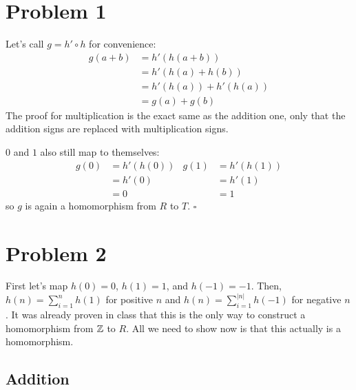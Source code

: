 \documentclass[12pt]{article}
\begin{document}
\section{Problem 1}

Let's call $g = h' \circ h$ for convenience:
\begin{align*}
  g(a+b)
   & = h'(h(a+b))        \\
   & = h'(h(a)+h(b))     \\
   & = h'(h(a))+h'(h(a)) \\
   & = g(a)+g(b)
\end{align*}
The proof for multiplication is the exact same as the addition one,
only that the addition signs are replaced with multiplication signs.

$0$ and $1$ also still map to themselves:
\begin{align*}
  g(0) & = h'(h(0)) & g(1) & = h'(h(1)) \\
       & = h'(0)    &      & = h'(1)    \\
       & = 0        &      & = 1
\end{align*}
so $g$ is again a homomorphism from $R$ to $T$. $\square$

\pagebreak

\section{Problem 2}

First let's map $h(0)=0$, $h(1)=1$, and $h(-1)=-1$.
Then, $h(n)=\sum_{i=1}^{n} h(1)$ for positive $n$
and $h(n)=\sum_{i=1}^{|n|} h(-1)$ for negative $n$.
It was already proven in class that this is the only way to construct
a homomorphism from $\mathbb{Z}$ to $R$.
All we need to show now is that this actually is a homomorphism.

\subsection{Addition}
\end{document}
